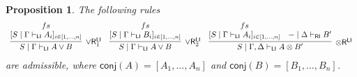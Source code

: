 \documentclass[submission,copyright,creativecommons]{eptcs}
\newtheorem{proposition}[theorem]{Proposition}
\theoremstyle{definition}
\newcommand{\tr}{\otimes \mathsf{R}}
\newcommand{\orrone}{\lor \mathsf{R}_{1}}
\newcommand{\orrtwo}{\lor \mathsf{R}_{2}}
\newcommand{\orri}{\lor \mathsf{R}_{i}}
\newcommand{\ot}{\otimes}
\newcommand{\RI}{\mathsf{RI}}
\newcommand{\LI}{\mathsf{LI}}
\newcommand{\conj}[1]{\mathsf{conj} (#1)}
\begin{document}
\begin{proposition}\label{prop:GenRightRules}
  The following rules
  \begin{displaymath}
    \begin{array}{c}
      \infer[\orrone^{\LI}]{S \mid \Gamma \vdash_{\LI} A \lor B}{
        \deduce{[S \mid \Gamma \vdash_{\LI} A_i]_{i \in [1 , \dots , n]}}{fs}
      }
      \quad
      \infer[\orrtwo^{\LI}]{S \mid \Gamma \vdash_{\LI} A \lor B}{
        \deduce{[S \mid \Gamma \vdash_{\LI} B_i]_{i \in [1 , \dots , n]}}{fs}
      }
      \quad
      \infer[\tr^{\LI}]{S \mid \Gamma , \Delta \vdash_{\LI} A \ot B'}{
        \deduce{[S \mid \Gamma \vdash_{\LI} A_i]_{i \in [1 , \dots , n]}}{fs}
        &
        - \mid \Delta \vdash_{\RI} B'
      }
    \end{array}
  \end{displaymath}
  are admissible, where $\conj{A} = [A_1 , \dots , A_n]$ and $\conj{B} = [B_1 , \dots , B_n]$.
\end{proposition}
\end{document}

